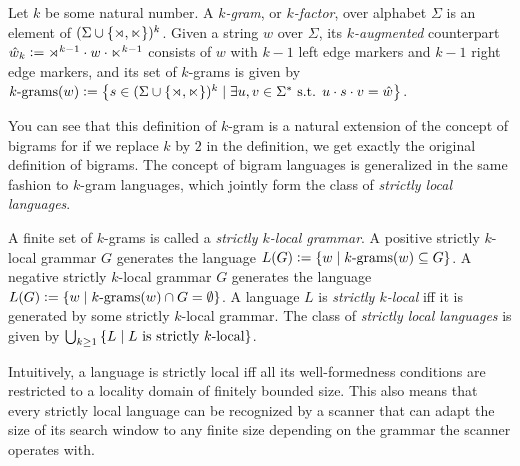 \begin{definition}[$k$-grams]
    Let $k$ be some natural number.
    A \emph{$k$-gram}, or \emph{$k$-factor}, over alphabet $\Sigma$ is an element of $(\Sigma \cup \setof{\LeftEdge, \RightEdge})^k$.
    Given a string $w$ over $\Sigma$, its \emph{$k$-augmented} counterpart $\augmented{w}_k \is \LeftEdge^{k-1} \stringcat w \stringcat \RightEdge^{k-1}$ consists of $w$ with $k-1$ left edge markers and $k-1$ right edge markers, and its set of $k$-grams is given by
    \(
        \Bigrams[k](w) \is
            \setof{
                s \in (\Sigma \cup \setof{\LeftEdge, \RightEdge})^k
                \mid
                \exists u,v \in \Sigma^* \text{ s.t. }
                u \stringcat s \stringcat v = \augmented{w}
            }
    \).
\end{definition}
%
You can see that this definition of $k$-gram is a natural extension of the concept of bigrams for if we replace $k$ by $2$ in the definition, we get exactly the original definition of bigrams.
The concept of bigram languages is generalized in the same fashion to $k$-gram languages, which jointly form the class of \emph{strictly local languages}.
%
%
\begin{definition}
    A finite set of $k$-grams is called a \emph{strictly $k$-local grammar}.
    A positive strictly $k$-local grammar $G$ generates the language
    \(
        L(G) \is
            \setof{ w \mid \Bigrams[k](w) \subseteq G }
    \).
    A negative strictly $k$-local grammar $G$ generates the language
    \(
        L(G) \is
            \setof{ w \mid \Bigrams[k](w) \cap G = \emptyset }
    \).
    A language $L$ is \emph{strictly $k$-local} iff it is generated by some strictly $k$-local grammar.
    The class of \emph{strictly local languages} is given by
    \(
        \bigcup_{k \geq 1} \setof{ L \mid L \text{ is strictly $k$-local} }
    \).
\end{definition}
%
Intuitively, a language is strictly local iff all its well-formedness conditions are restricted to a locality domain of finitely bounded size.
This also means that every strictly local language can be recognized by a scanner that can adapt the size of its search window to any finite size depending on the grammar the scanner operates with.
